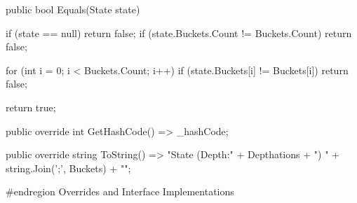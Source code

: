 \documentclass[a4paper,10pt,ngerman]{scrartcl}
\begin{document}
\begin{lstcs}
{        public bool Equals(State state)
        {
            if (state == null) return false;
            if (state.Buckets.Count != Buckets.Count) return false;

            for (int i = 0; i < Buckets.Count; i++)
            {
                if (state.Buckets[i] != Buckets[i]) return false;
            }

            return true;
        }

        public override int GetHashCode() => _hashCode;

        public override string ToString() => "State (Depth:" + Depthations + ") {" + string.Join(';', Buckets) + "}";

        #endregion Overrides and Interface Implementations
    }
\end{lstcs}
\end{document}
